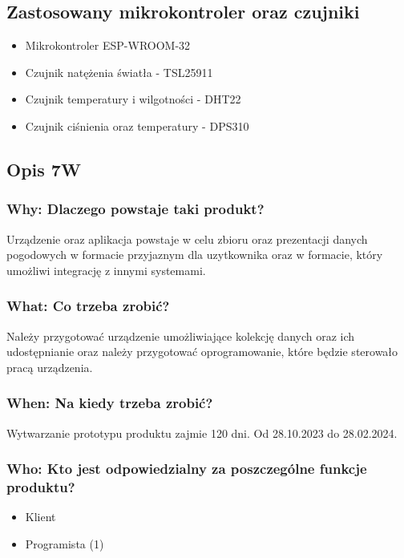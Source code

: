 \documentclass[12pt,a4paper]{article}
\begin{document}
\subsection{Zastosowany mikrokontroler oraz czujniki} \label{list_of_components}

\begin{itemize}
    \item Mikrokontroler ESP-WROOM-32
    \item Czujnik natężenia światła - TSL25911
    \item Czujnik temperatury i wilgotności - DHT22
    \item Czujnik ciśnienia oraz temperatury - DPS310
\end{itemize}

\subsection{Opis 7W}

\subsubsection{Why: Dlaczego powstaje taki produkt?}
Urządzenie oraz aplikacja powstaje w celu zbioru oraz prezentacji danych pogodowych w formacie przyjaznym dla uzytkownika oraz w formacie, który
umożliwi integrację z innymi systemami.

\subsubsection{What: Co trzeba zrobić?}
Należy przygotować urządzenie umożliwiające kolekcję danych oraz ich udostępnianie oraz należy przygotować oprogramowanie, które będzie 
sterowało pracą urządzenia.

\subsubsection{When: Na kiedy trzeba zrobić?}

Wytwarzanie prototypu produktu zajmie 120 dni. Od 28.10.2023 do 28.02.2024.

\subsubsection{Who: Kto jest odpowiedzialny za poszczególne funkcje produktu?}

\begin{itemize}
    \item Klient
    \item Programista (1)
\end{itemize}
\end{document}
